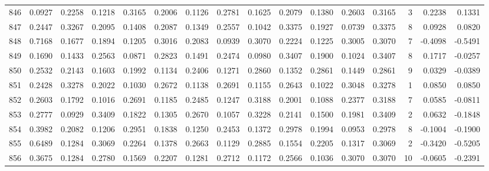 \begin{tabular}{lrrrrrrrrrrrrrrr}
846 &      0.0927 &  0.2258 &  0.1218 &  0.3165 &  0.2006 &  0.1126 &  0.2781 &  0.1625 &  0.2079 &  0.1380 &   0.2603 &     0.3165 &      3 &                    0.2238 &                     0.1331 \\
847 &      0.2447 &  0.3267 &  0.2095 &  0.1408 &  0.2087 &  0.1349 &  0.2557 &  0.1042 &  0.3375 &  0.1927 &   0.0739 &     0.3375 &      8 &                    0.0928 &                     0.0820 \\
848 &      0.7168 &  0.1677 &  0.1894 &  0.1205 &  0.3016 &  0.2083 &  0.0939 &  0.3070 &  0.2224 &  0.1225 &   0.3005 &     0.3070 &      7 &                   -0.4098 &                    -0.5491 \\
849 &      0.1690 &  0.1433 &  0.2563 &  0.0871 &  0.2823 &  0.1491 &  0.2474 &  0.0980 &  0.3407 &  0.1900 &   0.1024 &     0.3407 &      8 &                    0.1717 &                    -0.0257 \\
850 &      0.2532 &  0.2143 &  0.1603 &  0.1992 &  0.1134 &  0.2406 &  0.1271 &  0.2860 &  0.1352 &  0.2861 &   0.1449 &     0.2861 &      9 &                    0.0329 &                    -0.0389 \\
851 &      0.2428 &  0.3278 &  0.2022 &  0.1030 &  0.2672 &  0.1138 &  0.2691 &  0.1155 &  0.2643 &  0.1022 &   0.3048 &     0.3278 &      1 &                    0.0850 &                     0.0850 \\
852 &      0.2603 &  0.1792 &  0.1016 &  0.2691 &  0.1185 &  0.2485 &  0.1247 &  0.3188 &  0.2001 &  0.1088 &   0.2377 &     0.3188 &      7 &                    0.0585 &                    -0.0811 \\
853 &      0.2777 &  0.0929 &  0.3409 &  0.1822 &  0.1305 &  0.2670 &  0.1057 &  0.3228 &  0.2141 &  0.1500 &   0.1981 &     0.3409 &      2 &                    0.0632 &                    -0.1848 \\
854 &      0.3982 &  0.2082 &  0.1206 &  0.2951 &  0.1838 &  0.1250 &  0.2453 &  0.1372 &  0.2978 &  0.1994 &   0.0953 &     0.2978 &      8 &                   -0.1004 &                    -0.1900 \\
855 &      0.6489 &  0.1284 &  0.3069 &  0.2264 &  0.1378 &  0.2663 &  0.1129 &  0.2885 &  0.1554 &  0.2205 &   0.1317 &     0.3069 &      2 &                   -0.3420 &                    -0.5205 \\
856 &      0.3675 &  0.1284 &  0.2780 &  0.1569 &  0.2207 &  0.1281 &  0.2712 &  0.1172 &  0.2566 &  0.1036 &   0.3070 &     0.3070 &     10 &                   -0.0605 &                    -0.2391 \\

\end{tabular}
